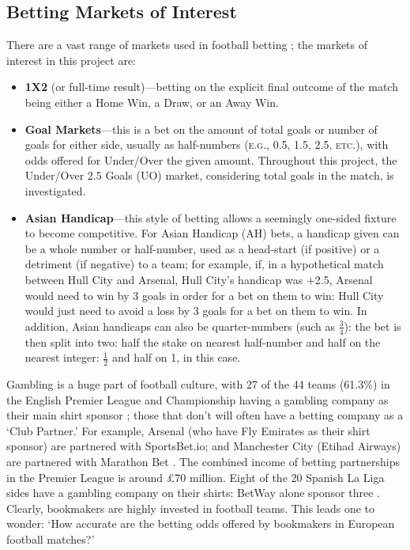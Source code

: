 \documentclass[a4paper,10pt]{report}
\begin{document}
\subsection{Betting Markets of Interest}\label{sec:introbackgamblinginfootball}
There are a vast range of markets used in football betting \autocite{Bet365Markets}; the markets of interest in this project are:
\begin{itemize}
	\item \textbf{1X2} (or full-time result)---betting on the explicit final outcome of the match being either a Home Win, a Draw, or an Away Win.
	\item \textbf{Goal Markets}---this is a bet on the amount of total goals or number of goals for either side, usually as half-numbers (\textsc{e.g.}, 0.5, 1.5, 2.5, \textsc{etc}.), with odds offered for Under/Over the given amount. Throughout this project, the Under/Over 2.5 Goals (UO) market, considering total goals in the match, is investigated.
	\item \textbf{Asian Handicap}---this style of betting allows a seemingly one-sided fixture to become competitive. For Asian Handicap (AH) bets, a handicap given can be a whole number or half-number, used as a head-start (if positive) or a detriment (if negative) to a team; for example, if, in a hypothetical match between Hull City and Arsenal, Hull City's handicap was $+$2.5, Arsenal would need to win by 3 goals in order for a bet on them to win: Hull City would just need to avoid a loss by 3 goals for a bet on them to win. In addition, Asian handicaps can also be quarter-numbers (such as $\frac{3}{4}$): the bet is then split into two: half the stake on nearest half-number and half on the nearest integer: $\frac{1}{2}$ and half on 1, in this case. 
\end{itemize}

Gambling is a huge part of football culture, with 27 of the 44 teams (61.3\%) in the English Premier League and Championship having a gambling company as their main shirt sponsor \autocite{Davey20}; those that don't will often have a betting company as a `Club Partner.' For example, Arsenal (who have Fly Emirates as their shirt sponsor) are partnered with SportsBet.io; and Manchester City (Etihad Airways) are partnered with Marathon Bet \autocite{PremierLeagueHandbook}. The combined income of betting partnerships in the Premier League is around £70 million. Eight of the 20 Spanish La Liga sides have a gambling company on their shirts: BetWay alone sponsor three \autocite{LaLigaSponsors}. Clearly, bookmakers are highly invested in football teams. This leads one to wonder: `How accurate are the betting odds offered by bookmakers in European football matches?' 
\end{document}
